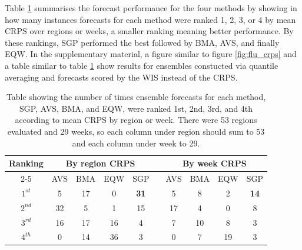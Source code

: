 Table \ref{tab:forecast_rank} summarises the forecast performance for the 
four methods by showing in how many instances forecasts for each method were 
ranked 1, 2, 3, or 4 by mean CRPS over regions or weeks, a smaller 
ranking meaning better performance. 
By these rankings, SGP performed the best followed by BMA, AVS, and finally
EQW. 
In the supplementary material, a figure similar to 
figure \ref{fig:flu_crps} and a table similar to table
\ref{tab:forecast_rank} show results for ensembles constucted via 
quantile averaging and forecasts scored by the WIS instead of the CRPS.


\begin{table}[h!]
\centering
\caption{Table showing the number of times ensemble forecasts for each method, 
SGP, AVS, BMA, and EQW, were ranked 1st, 2nd, 3rd, and 4th according to mean 
CRPS by region or week. There were 53
regions evaluated and 29 weeks, so each column under region should sum to 53
and each column under week to 29.}
 \begin{tabular}{cccccccccc}
  Ranking
  & \multicolumn{4}{c}{By region CRPS}
  &
  & \multicolumn{4}{c}{By week CRPS} \\
  \cmidrule{2-5}  \cmidrule{7-10}
  & AVS & BMA & EQW & SGP & & AVS & BMA & EQW & SGP\\
  \midrule
  $1^{st}$ & 5 & 17 & 0  & \textbf{31} & & 5  & 8  & 2  & \textbf{14}\\
  $2^{nd}$ & 32 & 5 & 1  & 15 & & 17 & 4  & 0  & 8\\
  $3^{rd}$ & 16 & 17& 16 & 4  & & 7  & 10 & 8  & 3\\
  $4^{th}$ & 0 & 14 & 36 & 3  & & 0  & 7  & 19 & 3\\
  \bottomrule
 \end{tabular}
 \label{tab:forecast_rank}
\end{table}


